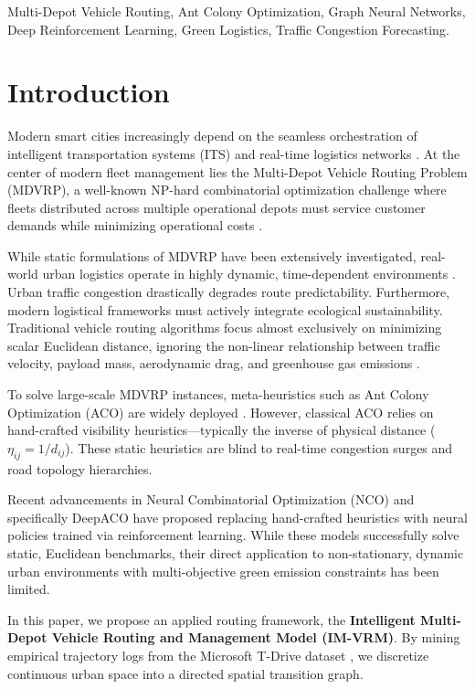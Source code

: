 \documentclass[conference]{IEEEtran}
\begin{document}
\begin{IEEEkeywords}
Multi-Depot Vehicle Routing, Ant Colony Optimization, Graph Neural Networks, Deep Reinforcement Learning, Green Logistics, Traffic Congestion Forecasting.
\end{IEEEkeywords}

\section{Introduction}
\label{sec:intro}

Modern smart cities increasingly depend on the seamless orchestration of intelligent transportation systems (ITS) and real-time logistics networks \cite{smart_cities_ref1}. At the center of modern fleet management lies the Multi-Depot Vehicle Routing Problem (MDVRP), a well-known NP-hard combinatorial optimization challenge where fleets distributed across multiple operational depots must service customer demands while minimizing operational costs \cite{mdvrp_ref1}.

While static formulations of MDVRP have been extensively investigated, real-world urban logistics operate in highly dynamic, time-dependent environments \cite{tdvrp_ref}. Urban traffic congestion drastically degrades route predictability. Furthermore, modern logistical frameworks must actively integrate ecological sustainability. Traditional vehicle routing algorithms focus almost exclusively on minimizing scalar Euclidean distance, ignoring the non-linear relationship between traffic velocity, payload mass, aerodynamic drag, and greenhouse gas emissions \cite{green_logistics_ref1}. 

To solve large-scale MDVRP instances, meta-heuristics such as Ant Colony Optimization (ACO) are widely deployed \cite{aco_ref1}. However, classical ACO relies on hand-crafted visibility heuristics—typically the inverse of physical distance ($\eta_{ij} = 1/d_{ij}$). These static heuristics are blind to real-time congestion surges and road topology hierarchies. 

Recent advancements in Neural Combinatorial Optimization (NCO) \cite{nco_bengio} and specifically DeepACO \cite{deep_aco_ref} have proposed replacing hand-crafted heuristics with neural policies trained via reinforcement learning. While these models successfully solve static, Euclidean benchmarks, their direct application to non-stationary, dynamic urban environments with multi-objective green emission constraints has been limited.

In this paper, we propose an applied routing framework, the \textbf{Intelligent Multi-Depot Vehicle Routing and Management Model (IM-VRM)}. By mining empirical trajectory logs from the Microsoft T-Drive dataset \cite{tdrive}, we discretize continuous urban space into a directed spatial transition graph. 
\end{document}
